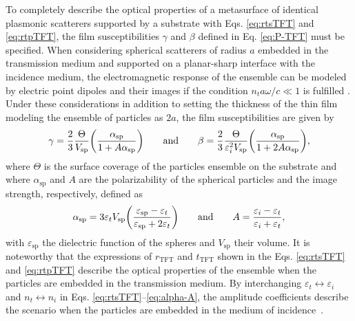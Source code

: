 To completely describe the optical properties of a metasurface of identical plasmonic scatterers supported by a substrate with Eqs. \eqref{eq:rtsTFT} and \eqref{eq:rtpTFT}, the film susceptibilities $\gamma$ and $\beta$ defined in Eq. \eqref{eq:P-TFT} must be specified. When considering spherical scatterers of radius $a$ embedded in the transmission medium and supported on a planar-sharp interface with the incidence medium, the electromagnetic response of the ensemble can be modeled by electric point dipoles and their images if the condition $n_ta\omega/c \ll 1$ is fulfilled \cite{lazzari_granfilm_2002}. Under these considerations in addition to setting the thickness of the thin film modeling the ensemble of particles as $2a$, the film susceptibilities are given by \cite{lazzari_granfilm_2002,bedeaux_optical_2004,haarmans_optical_1995}
%
\begin{align}
	\gamma = \frac23 \frac{\Theta}{V_\text{sp}} \qty( \frac{\alpha_\text{sp}}{1 + A \alpha_\text{sp}})
	\qquad\text{and}\qquad
	 \beta =\frac23 \frac{\Theta}{\varepsilon_i^2 V_\text{sp}} \qty(\frac{\alpha_\text{sp}}{1 + 2 A \alpha_\text{sp}}),
\label{eq:gammabeta}
\end{align}
%
where $\Theta$ is the surface coverage of the particles ensemble on the substrate and where $\alpha_\text{sp}$ and $A$ are the polarizability of the spherical particles and the image strength, respectively, defined as
%
\begin{align}
	\alpha_\text{sp} = 3  \varepsilon_t V_\text{sp} \qty(\frac{\varepsilon_\text{sp} - \varepsilon_t}{\varepsilon_\text{sp} + 2 \varepsilon_t}) 
	\qquad\text{and}\qquad
	A = \frac{\varepsilon_i - \varepsilon_t}{\varepsilon_i + \varepsilon_t},
	\label{eq:alpha-A}
\end{align}
%
with  $\varepsilon_\text{sp}$ the dielectric function of the spheres and $V_\text{sp}$ their volume. It is noteworthy that  the expressions of $r_\text{TFT}$ and $t_\text{TFT}$ shown in the Eqs. \eqref{eq:rtsTFT} and \eqref{eq:rtpTFT} describe the optical properties of the ensemble when the particles are embedded in the transmission medium. By interchanging $\varepsilon_t \leftrightarrow \varepsilon_i$ and $n_ t \leftrightarrow n_i$ in Eqs. \eqref{eq:rtsTFT}--\eqref{eq:alpha-A}, the amplitude coefficients describe the scenario when the particles are embedded in the medium of incidence~\cite{bedeaux_optical_2004}.
































